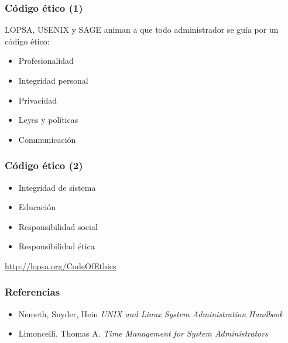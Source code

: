 \documentclass{beamer}
\begin{document}
\begin{frame}
\frametitle{Código ético (1)}

LOPSA, USENIX y SAGE animan a que todo administrador se guía por un código ético:  

\begin{itemize}
\item Profesionalidad
\item Integridad personal
\item Privacidad
\item Leyes y políticas
\item Communicación
\end{itemize}
\end{frame}


\begin{frame}
\frametitle{Código ético (2)}

\begin{itemize}
\item Integridad de sistema
\item Educación
\item Responsibilidad social
\item Responsibilidad ética
\end{itemize}

\url{http://lopsa.org/CodeOfEthics}

\end{frame}


\begin{frame}
\frametitle{Referencias}

\begin{itemize}
\item Nemeth, Snyder, Hein \textit{UNIX and Linux System Administration Handbook}
\item Limoncelli, Thomas A. \textit{Time Management for System Administrators} 
\end{itemize}

\end{frame}
\end{document}
